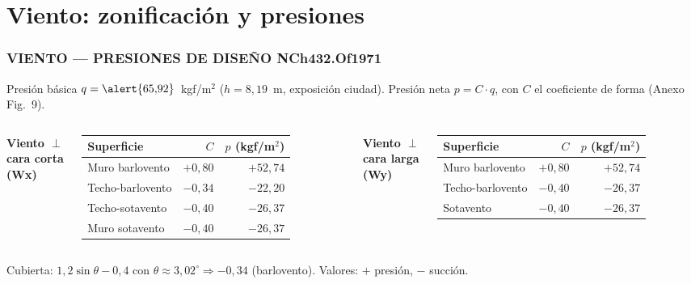 \documentclass[11.5pt,aspectratio=169,handout]{beamer}
\newcommand{\ctitle}[1]{\frametitle{#1}}
\begin{document}
\section{Viento: zonificación y presiones}

\begin{frame}
\ctitle{VIENTO --- PRESIONES DE DISEÑO NCh432.Of1971}
\vspace{-1mm}
\begin{center}{\footnotesize
Presión básica $q = \alert{65{,}92}$~kgf/m$^2$ ($h = 8{,}19$~m, exposición ciudad).
Presión neta $p = C\cdot q$, con $C$ el \alert{coeficiente de forma} (Anexo Fig.~9).}
\end{center}
\vspace{2mm}
\begin{columns}[T,totalwidth=\textwidth]
  \centering
  {\footnotesize\textbf{Viento $\perp$ cara corta (Wx)}}\\[1.5mm]
  {\scriptsize
  \begin{tabular}{@{}lrr@{}}
    \toprule
    Superficie & $C$ & $p$ (kgf/m$^2$) \\
    \midrule
    Muro barlovento  & $+0{,}80$ & $+52{,}74$ \\
    Techo-barlovento & $-0{,}34$ & $-22{,}20$ \\
    Techo-sotavento  & $-0{,}40$ & $-26{,}37$ \\
    Muro sotavento   & $-0{,}40$ & $-26{,}37$ \\
    \bottomrule
  \end{tabular}}
  \centering
  {\footnotesize\textbf{Viento $\perp$ cara larga (Wy)}}\\[1.5mm]
  {\scriptsize
  \begin{tabular}{@{}lrr@{}}
    \toprule
    Superficie & $C$ & $p$ (kgf/m$^2$) \\
    \midrule
    Muro barlovento  & $+0{,}80$ & $+52{,}74$ \\
    Techo-barlovento & $-0{,}40$ & $-26{,}37$ \\
    Sotavento        & $-0{,}40$ & $-26{,}37$ \\
    \bottomrule
  \end{tabular}}
\end{columns}
\vspace{3mm}
{\scriptsize\centering Cubierta: $1{,}2\sin\theta - 0{,}4$ con $\theta \approx 3{,}02^\circ \Rightarrow -0{,}34$ (barlovento). Valores: $+$ presión, $-$ succión.\par}
\end{frame}
\end{document}
